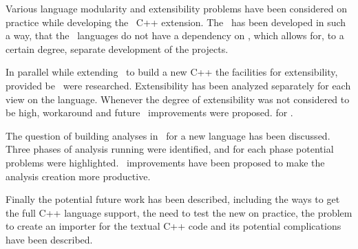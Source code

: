 Various language modularity and extensibility problems have been considered on 
practice while developing the \mbdr\ C++ extension. The \pcpp\ has been developed in 
such a way, that the \mbdp\ languages do not have a dependency on \pcpp, which
allows for, to a certain degree, separate development of the projects.

In parallel  while extending \mbdr\ to build a new C++  the facilities 
for extensibility, provided be \jbmps\ were researched. Extensibility has been 
analyzed separately for each view on the language. Whenever the degree of extensibility 
was not considered to be high, workaround and future \jbmps\ improvements were proposed.
for \jbmps.

The question of building analyses in \jbmps\ for a new language has been discussed.
Three phases of analysis running were identified, and for each phase potential problems
were highlighted. \jbmps\ improvements have been proposed to make the analysis creation 
more productive.

Finally the potential future work has been described, including the ways to get the full C++ language 
support, the need to test the new  on practice, the problem to create an importer for the
textual C++ code and its potential complications have been described.